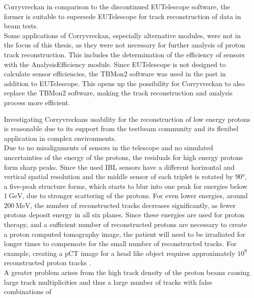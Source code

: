 Corryvreckan in comparison to the discontinued EUTelescope software, the former is suitable to supersede EUTelescope for track reconstruction of data in beam tests. \\
Some applications of Corryvreckan, especially alternative modules, were not in the focus of this thesis,
as they were not necessary for further analysis of proton track reconstruction. This includes the determination of the
efficiency of sensors with the AnalysisEfficiency module. Since EUTelescope is not designed to calculate sensor efficiencies,
the TBMon2 software was used in the past in addition
to EUTelescope. This opens up the possibility for Corryvreckan to also replace the TBMon2 software, making the track reconstruction and analysis process more efficient.

Investigating Corryvreckans usability for the reconstruction of low energy protons is reasonable due to its support from the testbeam community and
its flexibel application in complex environments. \\
Due to no misalignments of sensors in the telescope and no simulated uncertainties
of the energy of the protons, the residuals for high energy protons form sharp peaks. Since the used IBL sensors have a different
horizontal and vertical spatial resolution and the middle sensor of each triplet is rotated by 90°, a five-peak structure
forms, which starts to blur into one peak for energies below $\SI{1}{\giga\eV}$, due to stronger scattering of the protons. For even lower energies,
around $\SI{200}{\mega\eV}$, the number of reconstructed tracks decreases significantly, as fewer protons deposit energy in all six planes. Since these energies are
used for proton therapy, and a sufficient number of reconstructed protons are necessary to create a proton computed tomography image, the patient
will need to be irradiated for longer times to compensate for the small number of reconstructed tracks. For example, creating a pCT image for a head
like object requires approximately $10^9$ reconstructed proton tracks \cite{number_protons}. \\
A greater problem arises from the high track density of the proton beams causing large track multiplicities and thus a large number of tracks with false combinations of
